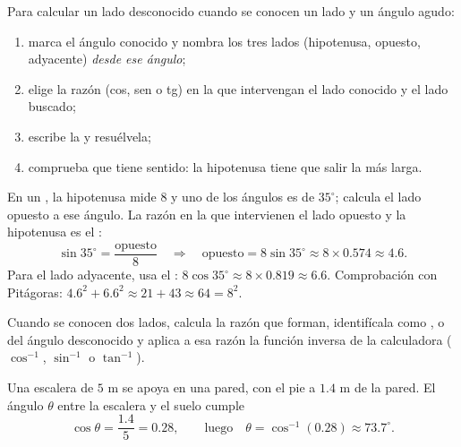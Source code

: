 \begin{method}\label{met:g9:trig:side}
Para calcular un lado desconocido cuando se conocen un lado y un ángulo agudo:
\begin{enumerate}
  \item marca el ángulo conocido y nombra los tres lados (hipotenusa,
        opuesto, adyacente) \emph{desde ese ángulo};
  \item elige la razón (cos, sen o tg) en la que intervengan el lado conocido
        y el lado buscado;
  \item escribe la  y resuélvela;
  \item comprueba que tiene sentido: la hipotenusa tiene que salir la más larga.
\end{enumerate}
\end{method}

\begin{example}\label{ex:g9:trig:side}
En un , la hipotenusa mide $8$ y uno de los ángulos es de
$35^\circ$; calcula el lado opuesto a ese ángulo. La razón en la que intervienen el
lado opuesto y la hipotenusa es el :
\[
\sin 35^\circ = \frac{\text{opuesto}}{8}
\quad\Longrightarrow\quad
\text{opuesto} = 8 \sin 35^\circ \approx 8 \times 0.574 \approx 4.6 .
\]
Para el lado adyacente, usa el :
$8\cos 35^\circ \approx 8 \times 0.819 \approx 6.6$. Comprobación con
Pitágoras: $4.6^2 + 6.6^2 \approx 21 + 43 \approx 64 = 8^2$.
\end{example}

\begin{method}\label{met:g9:trig:angle}
Cuando se conocen dos lados, calcula la razón que forman, identifícala como
,  o  del ángulo desconocido y aplica a esa razón la función
inversa de la calculadora ($\cos^{-1}$, $\sin^{-1}$ o $\tan^{-1}$).
\end{method}

\begin{example}\label{ex:g9:trig:angle}
Una escalera de $5$ m se apoya en una pared, con el pie a $1.4$ m de la
pared. El ángulo $\theta$ entre la escalera y el suelo cumple
\[
\cos\theta = \frac{1.4}{5} = 0.28,
\qquad\text{luego}\quad
\theta = \cos^{-1}(0.28) \approx 73.7^\circ .
\]
\end{example}

